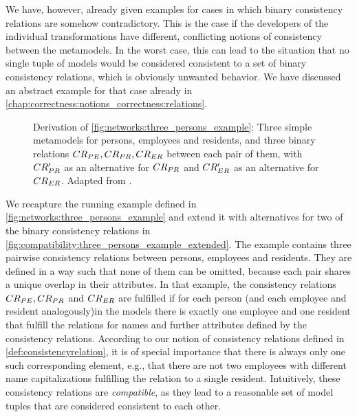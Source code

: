 We have, however, already given examples for cases in which binary consistency relations are somehow contradictory.
This is the case if the developers of the individual transformations have different, conflicting notions of consistency between the metamodels.
In the worst case, this can lead to the situation that no single tuple of models would be considered consistent to a set of binary consistency relations, which is obviously unwanted behavior.
We have discussed an abstract example for that case already in \autoref{chap:correctness:notions_correctness:relations}.

\begin{figure}
    \centering
    
    \caption[Three metamodels with (in)compatible consistency relations]{Derivation of \autoref{fig:networks:three_persons_example}: Three simple metamodels for persons, employees and residents, and three binary relations $CR_{PE}, CR_{PR}, CR_{ER}$ between each pair of them, with $CR_{PR}'$ as an alternative for $CR_{PR}$ and $CR_{ER}'$ as an alternative for $CR_{ER}$. Adapted from .}
    \label{fig:compatibility:three_persons_example_extended}
\end{figure}

We recapture the running example defined in \autoref{fig:networks:three_persons_example} and extend it with alternatives for two of the binary consistency relations in \autoref{fig:compatibility:three_persons_example_extended}.
The example contains three pairwise consistency relations between persons, employees and residents.
They are defined in a way such that none of them can be omitted, because each pair shares a unique overlap in their attributes.
In that example, the consistency relations $CR_{PE}, CR_{PR}$ and $CR_{ER}$ are fulfilled if for each person (and each employee and resident analogously)in the models there is exactly one employee and one resident that fulfill the relations for names and further attributes defined by the consistency relations.
According to our notion of consistency relations defined in \autoref{def:consistencyrelation}, it is of special importance that there is always only one such corresponding element, e.g., that there are not two employees with different name capitalizations fulfilling the relation to a single resident.
Intuitively, these consistency relations are \emph{compatible}, as they lead to a reasonable set of model tuples that are considered consistent to each other.

